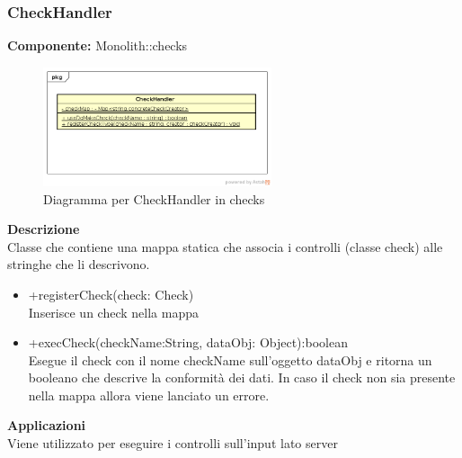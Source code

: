 \subsubsection{CheckHandler}
\textbf{Componente:}  Monolith::checks\\
   \FloatBarrier
   \begin{figure}[ht]
   \centering
   \includegraphics[width=0.6\textwidth]{img/single-CheckHandler}
   \caption{{Diagramma per CheckHandler in checks}}
\end{figure}
\FloatBarrier
\textbf{Descrizione}\\
Classe che contiene una mappa statica che associa i controlli (classe check) alle stringhe che li descrivono. 
\begin{itemize}
\item +registerCheck(check: Check) \\
Inserisce un check nella mappa
\item +execCheck(checkName:String, dataObj: Object):boolean \\
Esegue il check con il nome checkName sull'oggetto dataObj e ritorna un booleano che descrive la conformità dei dati. In caso il check non sia presente nella mappa allora viene lanciato un errore.
\end{itemize} 


\textbf{Applicazioni}\\
Viene utilizzato per eseguire i controlli sull'input lato server 


\clearpage

